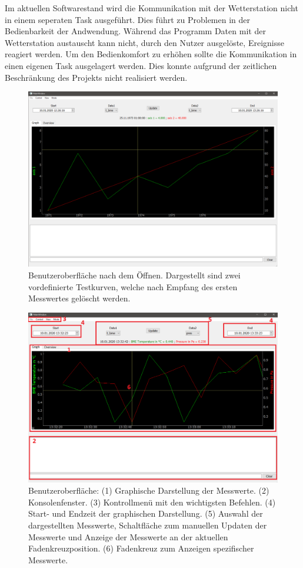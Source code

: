 Im aktuellen Softwarestand wird die Kommunikation mit der Wetterstation nicht in einem seperaten Task ausgeführt. Dies führt zu Problemen in der Bedienbarkeit der Andwendung. Während das Programm Daten mit der Wetterstation austauscht kann nicht, durch den Nutzer ausgelöste, Ereignisse reagiert werden. Um den Bedienkomfort zu erhöhen sollte die Kommunikation in einen eigenen Task ausgelagert werden. Dies konnte aufgrund der zeitlichen Beschränkung des Projekts nicht realisiert werden.
\begin{figure}[H]
  \centering
  \includegraphics[width=\textwidth]{./img/ui_open}
  \caption{Benutzeroberfläche nach dem Öffnen. Dargestellt sind zwei vordefinierte Testkurven, welche nach Empfang des ersten Messwertes gelöscht werden.}\label{fig:ui_open}
\end{figure}
\begin{figure}[H]
  \centering
  \includegraphics[width=\textwidth]{./img/ui_simulated_graph}
  \caption{Benutzeroberfläche: (1) Graphische Darstellung der Messwerte. (2) Konsolenfenster. (3) Kontrollmenü mit den wichtigsten Befehlen. (4) Start- und Endzeit der graphischen Darstellung. (5) Auswahl der dargestellten Messwerte, Schaltfläche zum manuellen Updaten der Messwerte und Anzeige der Messwerte an der aktuellen Fadenkreuzposition. (6) Fadenkreuz zum Anzeigen spezifischer Messwerte.}\label{fig:ui_graph}
\end{figure}
